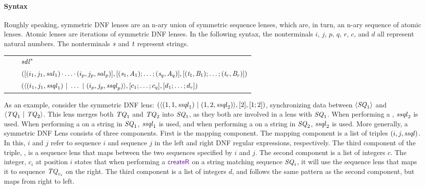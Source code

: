 \documentclass[acmsmall,screen,anonymous]{acmart}
\begin{document}
\paragraph*{Syntax}
Roughly speaking, symmetric DNF lenses are an n-ary union of symmetric sequence
lenses, which are, in turn, an n-ary sequence of atomic lenses. Atomic lenses
are iterations of symmetric DNF lenses. In the following syntax, the
nonterminals $i$, $j$, $p$, $q$, $r$, $c$, and $d$ all represent natural
numbers. The nonterminals $\mathit{s}$ and $\mathit{t}$ represent strings.
\begin{center}
  \begin{tabular}{@{}r@{\ }c@{}l@{}}
    \SAtomLens{} & \GEq{} & ${\mathit{sdl}}^*$ \\
    \SSQLens{} & \GEq{} & $([(i_1,j_1,\mathit{sal}_1)\mkern-1mu\cdot\mkern-1mu
                          \ldots\mkern-1mu\cdot\mkern-1mu
                          (i_p,j_p,\mathit{sal}_p)]
                          ,[ (\mathit{s}_1,\mathit{A}_1);\ldots;(\mathit{s}_q,\mathit{A}_q) ]
                          ,[ (\mathit{t}_1,\mathit{B}_1);\ldots;(\mathit{t}_r,\mathit{B}_r) ])$ \\
    \SDNFLens{} & \GEq{} & $(\langle(i_1,j_1,\mathit{ssql}_1)~|~
                           \ldots~|~
                           (i_p,j_p,\mathit{ssql}_p)\rangle
                           ,[ c_1;\ldots;c_q ]
                           ,[ d_1;\ldots;d_r ])$ \\
  \end{tabular}
\end{center}

As an example, consider the symmetric DNF lens:
$(\langle(1,1,\mathit{ssql}_1)~|~ (1,2,\mathit{ssql}_2)\rangle
,[ 2 ],[ 1;2 ])$, synchronizing data between $\langle\mathit{SQ}_1\rangle$ and
$\langle\mathit{TQ}_1 ~|~ \mathit{TQ}_2\rangle$. This lens merges both
$\mathit{TQ}_1$ and $\mathit{TQ}_2$ into $\mathit{SQ}_1$, as they both are
involved in a lens with $\mathit{SQ}_1$. When performing a \CreateR, $\mathit{ssql}_2$
is used. When performing a \CreateL on a string in $\mathit{SQ}_1$, $\mathit{ssql}_1$
is used, and when performing a \CreateL on a string in $\mathit{SQ}_2$,
$\mathit{ssql}_2$ is used. More generally, a symmetric DNF Lens \SDNFLens{} consists
of three components. First is the mapping component. The mapping component is a
list of triples $(i,j,\mathit{ssql})$. In this, $i$ and $j$ refer to sequence $i$ and
sequence $j$ in the left and right DNF regular expressions, respectively. The
third component of the triple, \SSQLens{}, is a sequence lens that maps between
the two sequences specified by $i$ and $j$. The second component is a list of
integers $c$. The integer, $c_i$ at position $i$ states that when performing a
$\CreateR$ on a string matching sequence $\mathit{SQ}_i$, it will use the sequence
lens that maps it to sequence $\mathit{TQ}_{c_i}$ on the right. The third
component is a list of integers $d$, and follows the same pattern as the second
component, but maps from right to left.
\end{document}
